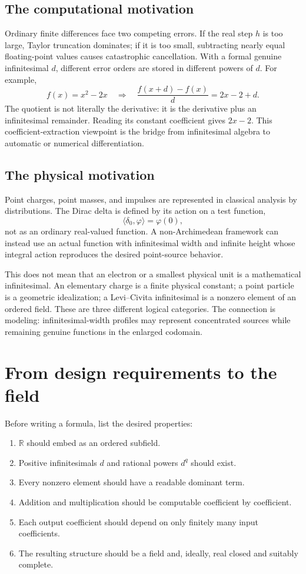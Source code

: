 \documentclass[11pt,a4paper]{article}
\theoremstyle{remark}
\newcommand{\R}{\mathbb R}
\begin{document}
\subsection{The computational motivation}

Ordinary finite differences face two competing errors. If the real step $h$ is too large, Taylor
truncation dominates; if it is too small, subtracting nearly equal floating-point values causes
catastrophic cancellation. With a formal genuine infinitesimal $d$, different error orders are
stored in different powers of $d$. For example,
\[
f(x)=x^2-2x
\quad\Longrightarrow\quad
\frac{f(x+d)-f(x)}d=2x-2+d.
\]
The quotient is not literally the derivative: it is the derivative plus an infinitesimal
remainder. Reading its constant coefficient gives $2x-2$. This coefficient-extraction viewpoint
is the bridge from infinitesimal algebra to automatic or numerical differentiation.

\subsection{The physical motivation}

Point charges, point masses, and impulses are represented in classical analysis by distributions.
The Dirac delta is defined by its action on a test function,
\[
\langle\delta_0,\varphi\rangle=\varphi(0),
\]
not as an ordinary real-valued function. A non-Archimedean framework can instead use an actual
function with infinitesimal width and infinite height whose integral action reproduces the desired
point-source behavior.

This does not mean that an electron or a smallest physical unit is a mathematical infinitesimal.
An elementary charge is a finite physical constant; a point particle is a geometric idealization;
a Levi--Civita infinitesimal is a nonzero element of an ordered field. These are three different
logical categories. The connection is modeling: infinitesimal-width profiles may represent
concentrated sources while remaining genuine functions in the enlarged codomain.

\section{From design requirements to the field}

Before writing a formula, list the desired properties:
\begin{enumerate}
\item $\R$ should embed as an ordered subfield.
\item Positive infinitesimals $d$ and rational powers $d^q$ should exist.
\item Every nonzero element should have a readable dominant term.
\item Addition and multiplication should be computable coefficient by coefficient.
\item Each output coefficient should depend on only finitely many input coefficients.
\item The resulting structure should be a field and, ideally, real closed and suitably complete.
\end{enumerate}
\end{document}
